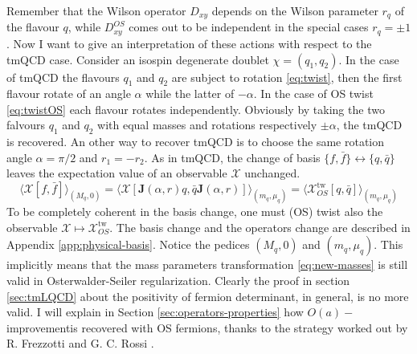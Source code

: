 \documentclass[english, LaM, oneside, noexaminfo]{sapthesis}
\newcommand{\la}{\langle}
\newcommand{\ra}{\rangle}
\newcommand{\oait}{$O(a)-$improvement}
\begin{document}
Remember that the Wilson operator $D_{xy}$ depends on the Wilson parameter $r_q$ of the flavour $q$, while $D_{xy}^{OS}$ comes out to be independent in the special cases $r_q = \pm 1$.
Now I want to give an interpretation of these actions with respect to the tmQCD case.
Consider an isospin degenerate doublet $\chi = (q_1, q_2)$.
In the case of tmQCD the flavours $q_1$ and $q_2$ are subject to rotation \ref{eq:twist}, then the first flavour rotate of an angle $\alpha$ while the latter of $-\alpha$.
In the case of OS twist \ref{eq:twistOS} each flavour rotates independently.
Obviously by taking the two falvours $q_1$ and $q_2$ with equal masses and rotations respectively $\pm \alpha$, the tmQCD is recovered.
An other way to recover tmQCD is to choose the same rotation angle $\alpha = \pi/2$ and $r_1 = - r_2$.
\newline
As in tmQCD, the change of basis $\{f,\bar f\} \leftrightarrow \{q,\bar q\}$ leaves the expectation value of an observable $\mathcal{X}$ unchanged.
\begin{equation*}
    \la \mathcal{X}[f,\bar f]\ra_{(M_q,0)} = \la \mathcal{X}[\mathbf{J}(\alpha, r) q,\bar q\mathbf{J}(\alpha, r)]\ra_{(m_q,\mu_q)} = \la \mathcal{X}^\text{tw}_{OS}[q,\bar q]\ra_{(m_q,\mu_q)}
\end{equation*}
To be completely coherent in the basis change, one must (OS) twist also the observable $\mathcal{X} \mapsto \mathcal{X}^\text{tw}_{OS}$.
The basis change and the operators change are described in Appendix \ref{app:physical-basis}.
Notice the pedices $(M_q,0)$ and $(m_q,\mu_q)$.
This implicitly means that the mass parameters transformation \ref{eq:new-masses} is still valid in Osterwalder-Seiler regularization.
\newline
Clearly the proof in section \ref{sec:tmLQCD} about the positivity of fermion determinant, in general, is no more valid.
I will explain in Section \ref{sec:operators-properties} how \oait\space is recovered with OS fermions, thanks to the strategy worked out by R. Frezzotti and G. C. Rossi \cite{FR2}.
\end{document}
